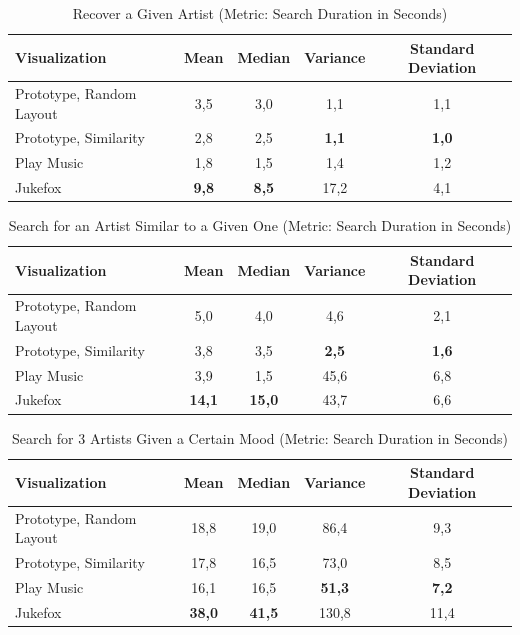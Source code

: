 \begin{table}[H]
\begin{center}
\begin{tabular}{ | l | c | c | c | c |}
	\hline
	\textbf{Visualization} & \textbf{Mean} & \textbf{Median} & \textbf{Variance} & \textbf{Standard Deviation}\\ \hline
	Prototype, Random Layout & 3,5 & 3,0 & 1,1 & 1,1 \\ \hline
	Prototype, Similarity & 2,8 & 2,5 & \textbf{1,1} & \textbf{1,0} \\ \hline
	Play Music & 1,8 & 1,5 & 1,4 & 1,2 \\ \hline
	Jukefox & \textbf{9,8} & \textbf{8,5} & 17,2 & 4,1 \\ \hline
\end{tabular}
\caption {Recover a Given Artist (Metric: Search Duration in Seconds)} \label{tab:refind-given} 
\end{center}
\end{table}

\begin{table}[H]
\begin{center}
\begin{tabular}{ | l | c | c | c | c |}
	\hline
	\textbf{Visualization} & \textbf{Mean} & \textbf{Median} & \textbf{Variance} & \textbf{Standard Deviation}\\ \hline
	Prototype, Random Layout & 5,0 & 4,0 & 4,6 & 2,1 \\ \hline
	Prototype, Similarity & 3,8 & 3,5 & \textbf{2,5} & \textbf{1,6} \\ \hline
	Play Music & 3,9 & 1,5 & 45,6 & 6,8 \\ \hline
	Jukefox & \textbf{14,1} & \textbf{15,0} & 43,7 & 6,6 \\ \hline
\end{tabular}
\caption {Search for an Artist Similar to a Given One (Metric: Search Duration in Seconds)} \label{tab:search-similar} 
\end{center}
\end{table}

\begin{table}[H]
\begin{center}
\begin{tabular}{ | l | c | c | c | c |}
	\hline
	\textbf{Visualization} & \textbf{Mean} & \textbf{Median} & \textbf{Variance} & \textbf{Standard Deviation}\\ \hline
	Prototype, Random Layout & 18,8 & 19,0 & 86,4 & 9,3 \\ \hline
	Prototype, Similarity & 17,8 & 16,5 & 73,0 & 8,5 \\ \hline
	Play Music & 16,1 & 16,5 & \textbf{51,3} & \textbf{7,2} \\ \hline
	Jukefox & \textbf{38,0} & \textbf{41,5} & 130,8 & 11,4 \\ \hline
\end{tabular}
\caption {Search for 3 Artists Given a Certain Mood (Metric: Search Duration in Seconds)} \label{tab:search-mood} 
\end{center}
\end{table}


